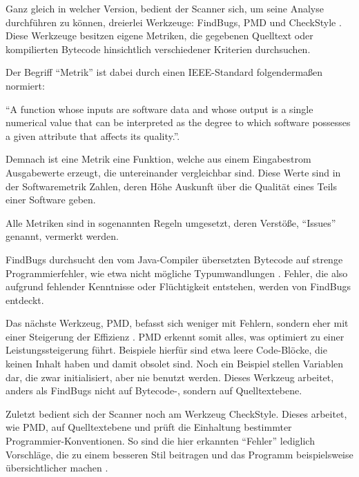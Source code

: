 Ganz gleich in welcher Version, bedient der Scanner sich, um seine Analyse durchführen zu können,  dreierlei Werkzeuge:  \glqq FindBugs\grqq{}, \glqq PMD\grqq{} und \glqq CheckStyle\grqq{} \autocite[Vgl.][]{FindBugsPMDCheckStyle}. Diese Werkzeuge besitzen eigene Metriken, die gegebenen Quelltext oder kompilierten Bytecode hinsichtlich verschiedener Kriterien durchsuchen. 

Der Begriff \enquote{Metrik} ist dabei durch einen IEEE-Standard folgendermaßen normiert:

\enquote{A function whose inputs are software data and whose output is a single numerical value that can be interpreted as the degree to which software possesses a given attribute that affects its quality.}\autocite{IEEE1061-1998}.

Demnach ist eine Metrik eine Funktion, welche aus einem Eingabestrom Ausgabewerte erzeugt, die untereinander vergleichbar sind. Diese Werte sind in der Softwaremetrik Zahlen, deren Höhe Auskunft über die Qualität eines Teils einer Software geben.

Alle Metriken sind in sogenannten Regeln umgesetzt, deren Verstöße, \enquote{Issues} genannt, vermerkt werden.

FindBugs durchsucht den vom Java-Compiler übersetzten Bytecode auf strenge Programmierfehler, wie etwa nicht mögliche Typumwandlungen \autocite[Vgl.][]{FindBugs}. Fehler, die also aufgrund fehlender Kenntnisse oder Flüchtigkeit entstehen, werden von FindBugs entdeckt.

Das nächste Werkzeug, PMD, befasst sich weniger mit Fehlern, sondern eher mit einer Steigerung der Effizienz \autocite[Vgl.][]{PMD}. PMD erkennt somit alles, was optimiert zu einer Leistungssteigerung führt. Beispiele hierfür sind etwa leere Code-Blöcke, die keinen Inhalt haben und damit obsolet sind. Noch ein Beispiel stellen Variablen dar, die zwar initialisiert, aber nie benutzt werden.  Dieses Werkzeug arbeitet, anders als FindBugs nicht auf Bytecode-, sondern auf Quelltextebene.

Zuletzt bedient sich der Scanner noch am Werkzeug CheckStyle. Dieses arbeitet, wie PMD, auf Quelltextebene und prüft die Einhaltung bestimmter Programmier-Konventionen. So sind die hier erkannten \enquote{Fehler} lediglich Vorschläge, die zu einem besseren Stil beitragen und das Programm beispielsweise übersichtlicher machen \autocite[Vgl.][]{CheckStyle}.

